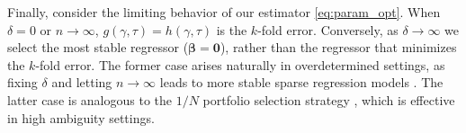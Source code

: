\documentclass[mnsc,nonblindrev]{informs3} %
\begin{document}
{{%



Finally, consider the limiting behavior of our estimator \eqref{eq:param_opt}. When $\delta=0$ or $n\to \infty$, $g(\gamma,\tau)=h(\gamma,\tau)$ is the $k$-fold error. Conversely, as $\delta \rightarrow \infty$ we select the most stable regressor ($\bm{\beta}=\bm{0}$), rather than the regressor that minimizes the $k$-fold error. The former case arises naturally in overdetermined settings, as fixing $\delta$ and letting $n \rightarrow \infty$ leads to more stable sparse regression models \citep[][]{ gamarnik2022sparse}. The latter case is analogous to the $1/N$ portfolio selection strategy \citep[cf.][]{demiguel2009portfolio}, which is effective in high ambiguity settings.
}}

\end{document}
